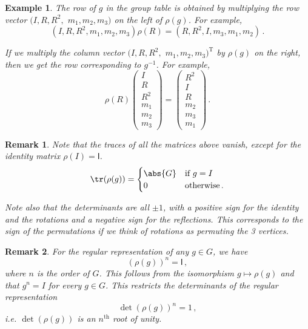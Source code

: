 \documentclass{article}
\theoremstyle{plain}\theoremheaderfont{\normalfont\itshape}\theorembodyfont{\rmfamily}\theoremseparator{.}\newtheorem*{rem}{Remark}\newtheorem*{ex}{Example}\newtheorem*{proof}{Proof}\newtheorem*{altp}{Alternative proof}
\theoremstyle{plain}\theoremheaderfont{\normalfont\bfseries}\theorembodyfont{\rmfamily}\theoremseparator{.}\newtheorem{thm}{Theorem}[section]\newtheorem{lem}[thm]{Lemma}\newtheorem{prop}[thm]{Proposition}\newtheorem*{cor}{Corollary}\newtheorem{defn}[thm]{Definition}\newtheorem{clm}[thm]{Claim}\newtheorem{clminproof}{Claim}
\theoremstyle{break}\theoremheaderfont{\normalfont\itshape}\theorembodyfont{\rmfamily}\theoremseparator{.\medskip}\newtheorem*{proofskip}{Proof}\newtheorem*{exs}{Examples}\newtheorem*{rems}{Remarks}
\theoremstyle{break}\theoremheaderfont{\normalfont\bfseries}\theorembodyfont{\rmfamily}\theoremseparator{.\medskip}\newtheorem{lemskip}[thm]{Lemma}\newtheorem{defnskip}[thm]{Definition}\newtheorem{propskip}[thm]{Proposition}\newtheorem{thmskip}[thm]{Theorem}
\numberwithin{equation}{section}
\newcommand{\tp}{^\mathrm{T}}
\begin{document}
\begin{ex}
		The row of \(g\) in the group table is obtained by multiplying the row vector \((I, R, R^2,\) \(m_1, m_2, m_3)\) on the left of \(\rho(g)\). For example,
		\[(I,R,R^2,m_1,m_2,m_3)\rho(R)=(R,R^2,I,m_3,m_1,m_2)\,.\]

		If we multiply the column vector \((I, R, R^2,\) \(m_1, m_2, m_3)\tp\) by \(\rho(g)\) on the right, then we get the row corresponding to \(g^{-1}\). For example,
		\[\rho(R)\begin{pmatrix}
			I \\ R \\ R^2 \\ m_1 \\ m_2 \\ m_3
		\end{pmatrix}=\begin{pmatrix}
			R^2 \\ I \\ R \\ m_2 \\ m_3 \\ m_1
		\end{pmatrix}\,.\]
	\end{ex}
	\begin{rem}
		Note that the traces of all the matrices above vanish, except for the identity matrix \(\rho(I)=\mathsf{I}\).
		\[\tr(\rho(g))=\begin{cases}
			\abs{G} & \text{if }g=I\\
			0 & \text{otherwise}\,.
		\end{cases}\]

		Note also that the determinants are all \(\pm 1\), with a positive sign for the identity and the rotations and a negative sign for the reflections. This corresponds to the sign of the permutations if we think of rotations as permuting the 3 vertices.
	\end{rem}
	\begin{rem}
		For the regular representation of any \(g\in G\), we have
		\[(\rho(g))^n=\mathsf{I}\,,\]
		where \(n\) is the order of \(G\). This follows from the isomorphism \(g\mapsto \rho(g)\) and that \(g^n=I\) for every \(g\in G\). This restricts the determinants of the regular representation
		\[\det(\rho(g))^n=1\,,\]
		i.e. \(\det(\rho(g))\) is an \(n^{\text{th}}\) root of unity.
	\end{rem}
\end{document}
